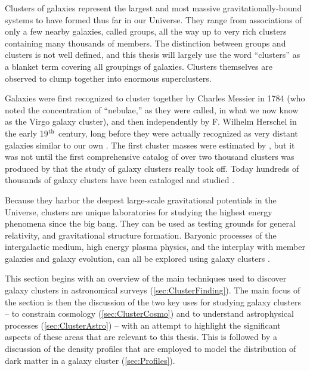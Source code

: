 Clusters of galaxies represent the largest and most massive gravitationally-bound systems to have formed thus far in our Universe. They range from associations of only a few nearby galaxies, called groups, all the way up to very rich clusters containing many thousands of members. The distinction between groups and clusters is not well defined, and this thesis will largely use the word ``clusters'' as a blanket term covering all groupings of galaxies. Clusters themselves are observed to clump together into enormous superclusters.

Galaxies were first recognized to cluster together by Charles Messier in 1784 (who noted the concentration of ``nebulae,'' as they were called, in what we now know as the Virgo galaxy cluster), and then independently by F. Wilhelm Herschel in the early 19$^{\rm th}$ century, long before they were actually recognized as very distant galaxies similar to our own \citep{Biviano00}. The first cluster masses were estimated by \citet{Zwicky33}, but it was not until the first comprehensive catalog of over two thousand clusters was produced by \citet{Abell58} that the study of galaxy clusters really took off. Today hundreds of thousands of galaxy clusters have been cataloged and studied \citep[see e.g.][]{Wen12}.

Because they harbor the deepest large-scale gravitational potentials in the Universe, clusters are unique laboratories for studying the highest energy phenomena since the big bang. They can be used as testing grounds for general relativity, and gravitational structure formation. Baryonic processes of the intergalactic medium, high energy plasma physics, and the interplay with member galaxies and galaxy evolution, can all be explored using galaxy clusters \citep{Kravtsov12}. 

This section begins with an overview of the main techniques used to discover galaxy clusters in astronomical surveys (\autoref{sec:ClusterFinding}).  The main focus of the section is then the discussion of the two key uses for studying galaxy clusters -- to constrain cosmology (\autoref{sec:ClusterCosmo}) and to understand astrophysical processes (\autoref{sec:ClusterAstro}) -- with an attempt to highlight the significant aspects of these areas that are relevant to this thesis. This is followed by a discussion of the density profiles that are employed to model the distribution of dark matter in a galaxy cluster (\autoref{sec:Profiles}).

